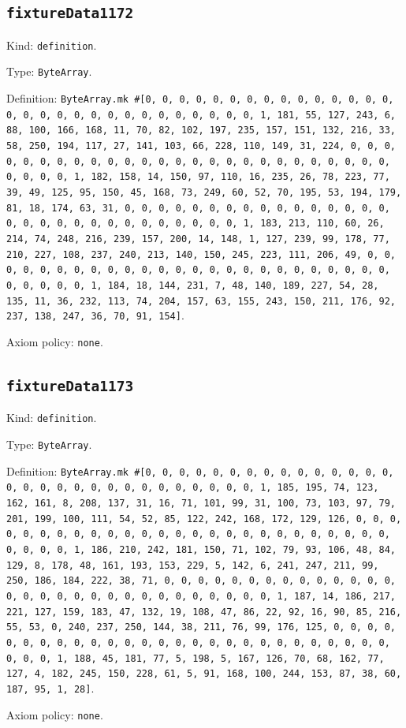 \documentclass[11pt]{article}
\begin{document}
\subsection*{\texttt{fixtureData1172}}
\noindent Kind: \texttt{definition}.\par
\noindent Type: \texttt{ByteArray}.\par
\noindent Definition: \texttt{ByteArray.mk \#[0, 0, 0, 0, 0, 0, 0, 0, 0, 0, 0, 0, 0, 0, 0, 0, 0, 0, 0, 0, 0, 0, 0, 0, 0, 0, 0, 0, 0, 0, 1, 181, 55, 127, 243, 6, 88, 100, 166, 168, 11, 70, 82, 102, 197, 235, 157, 151, 132, 216, 33, 58, 250, 194, 117, 27, 141, 103, 66, 228, 110, 149, 31, 224, 0, 0, 0, 0, 0, 0, 0, 0, 0, 0, 0, 0, 0, 0, 0, 0, 0, 0, 0, 0, 0, 0, 0, 0, 0, 0, 0, 0, 0, 0, 1, 182, 158, 14, 150, 97, 110, 16, 235, 26, 78, 223, 77, 39, 49, 125, 95, 150, 45, 168, 73, 249, 60, 52, 70, 195, 53, 194, 179, 81, 18, 174, 63, 31, 0, 0, 0, 0, 0, 0, 0, 0, 0, 0, 0, 0, 0, 0, 0, 0, 0, 0, 0, 0, 0, 0, 0, 0, 0, 0, 0, 0, 0, 0, 1, 183, 213, 110, 60, 26, 214, 74, 248, 216, 239, 157, 200, 14, 148, 1, 127, 239, 99, 178, 77, 210, 227, 108, 237, 240, 213, 140, 150, 245, 223, 111, 206, 49, 0, 0, 0, 0, 0, 0, 0, 0, 0, 0, 0, 0, 0, 0, 0, 0, 0, 0, 0, 0, 0, 0, 0, 0, 0, 0, 0, 0, 0, 0, 1, 184, 18, 144, 231, 7, 48, 140, 189, 227, 54, 28, 135, 11, 36, 232, 113, 74, 204, 157, 63, 155, 243, 150, 211, 176, 92, 237, 138, 247, 36, 70, 91, 154]}.\par
\noindent Axiom policy: \texttt{none}.\par
\subsection*{\texttt{fixtureData1173}}
\noindent Kind: \texttt{definition}.\par
\noindent Type: \texttt{ByteArray}.\par
\noindent Definition: \texttt{ByteArray.mk \#[0, 0, 0, 0, 0, 0, 0, 0, 0, 0, 0, 0, 0, 0, 0, 0, 0, 0, 0, 0, 0, 0, 0, 0, 0, 0, 0, 0, 0, 0, 1, 185, 195, 74, 123, 162, 161, 8, 208, 137, 31, 16, 71, 101, 99, 31, 100, 73, 103, 97, 79, 201, 199, 100, 111, 54, 52, 85, 122, 242, 168, 172, 129, 126, 0, 0, 0, 0, 0, 0, 0, 0, 0, 0, 0, 0, 0, 0, 0, 0, 0, 0, 0, 0, 0, 0, 0, 0, 0, 0, 0, 0, 0, 0, 1, 186, 210, 242, 181, 150, 71, 102, 79, 93, 106, 48, 84, 129, 8, 178, 48, 161, 193, 153, 229, 5, 142, 6, 241, 247, 211, 99, 250, 186, 184, 222, 38, 71, 0, 0, 0, 0, 0, 0, 0, 0, 0, 0, 0, 0, 0, 0, 0, 0, 0, 0, 0, 0, 0, 0, 0, 0, 0, 0, 0, 0, 0, 0, 1, 187, 14, 186, 217, 221, 127, 159, 183, 47, 132, 19, 108, 47, 86, 22, 92, 16, 90, 85, 216, 55, 53, 0, 240, 237, 250, 144, 38, 211, 76, 99, 176, 125, 0, 0, 0, 0, 0, 0, 0, 0, 0, 0, 0, 0, 0, 0, 0, 0, 0, 0, 0, 0, 0, 0, 0, 0, 0, 0, 0, 0, 0, 0, 1, 188, 45, 181, 77, 5, 198, 5, 167, 126, 70, 68, 162, 77, 127, 4, 182, 245, 150, 228, 61, 5, 91, 168, 100, 244, 153, 87, 38, 60, 187, 95, 1, 28]}.\par
\noindent Axiom policy: \texttt{none}.\par
\end{document}
